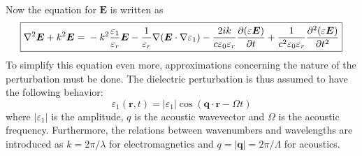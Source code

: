 \documentclass[10pt,a4paper,draft]{scrartcl}
\begin{document}
	Now the equation for $\bm{E}$ is written as
	\begin{equation*}
	\boxed{
		\nabla^2\bm{E} + k^2 \bm{E} = \\
		-k^2 \frac{\varepsilon_1}{\varepsilon_r} \bm{E} -\frac{1}{\varepsilon_r}\nabla(\bm{E} \cdot \nabla \varepsilon_1) - \frac{2ik}{c\varepsilon_0\varepsilon_r} \frac{\partial (\varepsilon \bm{E})}{\partial t} + \frac{1}{c^2 \varepsilon_0 \varepsilon_r} \frac{\partial^2 (\varepsilon \bm{E})}{\partial t^2}
	}
	\end{equation*}
	To simplify this equation even more, approximations concerning the nature of the perturbation must be done. The dielectric perturbation is thus assumed to have the following behavior:
	\begin{equation*}
		\varepsilon_1 (\bm{r},t) = |\varepsilon_1| \cos(\bm{q} \cdot \bm{r} - \Omega t)
	\end{equation*}
	where $|\varepsilon_1|$ is the amplitude, $q$ is the acoustic wavevector and $\Omega$ is the acoustic frequency. Furthermore, the relations between wavenumbers and wavelengths are introduced as $k = 2\pi/\lambda$ for electromagnetics and $q = |\bm{q}| = 2\pi/\Lambda$ for acoustics.
	
\end{document}
